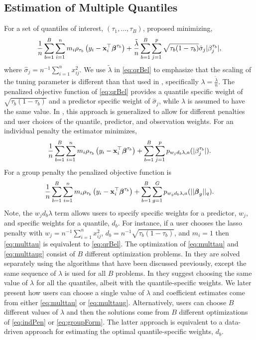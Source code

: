 \subsection{Estimation of Multiple Quantiles}\label{estimation-of-multiple-quantiles}

For a set of quantiles of interest, \((\tau_1,\ldots,\tau_B)\), \citet{qr_lasso} proposed minimizing,
\begin{equation}
\frac{1}{n} \sum_{b=1}^B\sum_{i=1}^n m_i \rho_{\tau_b}\left(y_i - {\bf x}_i^\top\boldsymbol \beta^{\tau_b}\right) + \frac{\tilde{\lambda}}{n} \sum_{b=1}^B\sum_{j=1}^p \sqrt{\tau_b(1-\tau_b)} \hat{\sigma}_j |\beta^{\tau_b}_j|,
\label{eq:qrBel}
\end{equation}
where \(\hat{\sigma}_j = n^{-1}\sum_{i=1}^n x_{ij}^2\). We use \(\tilde{\lambda}\) in \eqref{eq:qrBel} to emphasize that the scaling of the tuning parameter is different than that used in , specifically \(\lambda=\frac{\tilde{\lambda}}{n}\). The penalized objective function of \eqref{eq:qrBel} provides a quantile specific weight of \(\sqrt{\tau_b(1-\tau_b)}\) and a predictor specific weight of \(\hat{\sigma}_j\), while \(\lambda\) is assumed to have the same value. In , this approach is generalized to allow for different penalties and user choices of the quantile, predictor, and observation weights. For an individual penalty the estimator minimizes,
\begin{equation}
\frac{1}{n} \sum_{b=1}^B\sum_{i=1}^n m_i \rho_{\tau_b}\left(y_i - {\bf x}_i^\top\boldsymbol \beta^{\tau_b}\right) + \sum_{b=1}^B\sum_{j=1}^p p_{w_jd_b\lambda,a}(|\beta^{\tau_b}_j|).
\label{eq:multtau}
\end{equation}
For a group penalty the penalized objective function is
\begin{equation}
\frac{1}{n} \sum_{b=1}^B \sum_{i=1}^n m_i \rho_{\tau_b}\left(y_i - {\bf x}_i^\top\boldsymbol \beta^{\tau_b}\right) + \sum_{b=1}^B \sum_{g=1}^G p_{w_gd_b\lambda,a}(||\boldsymbol \beta_g||_q).
\label{eq:multtaug}
\end{equation}
Note, the \(w_jd_b\lambda\) term allows users to specify specific weights for a predictor, \(w_j\), and specific weights for a quantile, \(d_b\). For instance, if a user chooses the lasso penalty with \(w_j=n^{-1}\sum_{i=1}^nx_{ij}^2\), \(d_b=n^{-1}\sqrt{\tau_b(1-\tau_b)}\), and \(m_i=1\) then \eqref{eq:multtau} is equivalent to \eqref{eq:qrBel}. The optimization of \eqref{eq:multtau} and \eqref{eq:multtaug} consist of \(B\) different optimization problems. In  they are solved separately using the algorithms that have been discussed previously, except the same sequence of \(\lambda\) is used for all \(B\) problems. In \citet{qr_lasso} they suggest choosing the same value of \(\lambda\) for all the quantiles, albeit with the quantile-specific weights. We later present how users can choose a single value of \(\lambda\) and coefficient estimates come from either \eqref{eq:multtau} or \eqref{eq:multtaug}. Alternatively, users can choose \(B\) different values of \(\lambda\) and then the solutions come from \(B\) different optimizations of \eqref{eq:indPen} or \eqref{eq:groupForm}. The latter approach is equivalent to a data-driven approach for estimating the optimal quantile-specific weights, \(d_b\).

